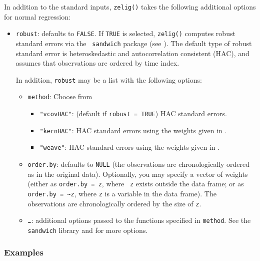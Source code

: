 \documentclass{article}
\begin{document}
In addition to the standard inputs, {\tt zelig()} takes the following
additional options for normal regression:  
\begin{itemize}
\item {\tt robust}: defaults to {\tt FALSE}.  If {\tt TRUE} is
selected, {\tt zelig()} computes robust standard errors via the {\tt
sandwich} package (see \cite{Zeileis04}).  The default type of robust
standard error is heteroskedastic and autocorrelation consistent (HAC),
and assumes that observations are ordered by time index.

In addition, {\tt robust} may be a list with the following options:  
\begin{itemize}
\item {\tt method}:  Choose from 
\begin{itemize}
\item {\tt "vcovHAC"}: (default if {\tt robust = TRUE}) HAC standard
errors. 
\item {\tt "kernHAC"}: HAC standard errors using the
weights given in \cite{Andrews91}. 
\item {\tt "weave"}: HAC standard errors using the
weights given in \cite{LumHea99}.  
\end{itemize}  
\item {\tt order.by}: defaults to {\tt NULL} (the observations are
chronologically ordered as in the original data).  Optionally, you may
specify a vector of weights (either as {\tt order.by = z}, where {\tt
z} exists outside the data frame; or as {\tt order.by = \~{}z}, where
{\tt z} is a variable in the data frame).  The observations are
chronologically ordered by the size of {\tt z}.
\item {\tt \dots}:  additional options passed to the functions 
specified in {\tt method}.   See the {\tt sandwich} library and
\cite{Zeileis04} for more options.   
\end{itemize}
\end{itemize}

\subsubsection{Examples}
\end{document}
